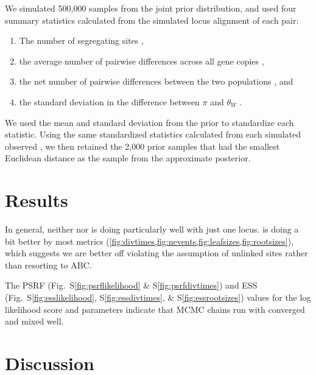 We simulated 500,000 samples from the joint prior distribution, and used four
summary statistics calculated from the simulated locus alignment of each pair:
\begin{enumerate}
    \item The number of segregating sites \citep[$\theta_W$;][]{Watterson1975},
    \item the average number of pairwise differences across all gene copies
        \citep[$\pi$;][]{NeiLi1979},
    \item the net number of pairwise differences between the two populations
        \citep[Equation 25 in][]{NeiLi1979}, and
    \item the standard deviation in the difference between $\pi$ and $\theta_W$
        \citep{Tajima1989}.
\end{enumerate}
We used the mean and standard deviation from the prior to standardize each
statistic.
Using the same standardized statistics calculated from each simulated observed
\dataset, we then retained the 2,000 prior samples that had the smallest
Euclidean distance as the sample from the approximate posterior.

\section{Results}

In general, neither \ecoevolity nor \dppmsbayes is doing particularly well with
just one locus.
\ecoevolity is doing a bit better by most metrics
(\cref{fig:divtimes,fig:nevents,fig:leafsizes,fig:rootsizes}),
which suggests we are better off violating the assumption of unlinked sites
rather than resorting to ABC.

\ifembed{

}{}

\ifembed{

}{}

\ifembed{

}{}

\ifembed{

}{}


The PSRF
(Fig.\
S\ref{fig:psrflikelihood}
\&
S\ref{fig:psrfdivtimes})
and ESS
(Fig.\
S\ref{fig:esslikelihood},
S\ref{fig:essdivtimes},
\&
S\ref{fig:essrootsizes})
values for the log likelihood score and parameters
indicate that MCMC chains run with \ecoevolity converged and mixed well.

\section{Discussion}
